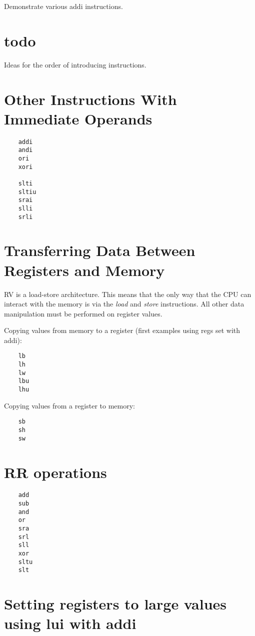 Demonstrate various addi instructions. 


\section{todo}

Ideas for the order of introducing instructions.


\section{Other Instructions With Immediate Operands}
\begin{verbatim}
    addi
    andi
    ori
    xori

    slti
    sltiu
    srai
    slli
    srli
\end{verbatim}


\section{Transferring Data Between Registers and Memory}

RV is a load-store architecture.  This means that the only way that the
CPU can interact with the memory is via the {\em load} and {\em store}
instructions.  All other data manipulation must be performed on register
values.

Copying values from memory to a register (first examples using regs set with addi):
\begin{verbatim}
    lb
    lh
    lw
    lbu
    lhu
\end{verbatim}

Copying values from a register to memory:
\begin{verbatim}
    sb
    sh
    sw
\end{verbatim}


\section{RR operations}
\begin{verbatim}
    add
    sub
    and
    or
    sra
    srl
    sll
    xor
    sltu
    slt
\end{verbatim}


\section{Setting registers to large values using lui with addi}

